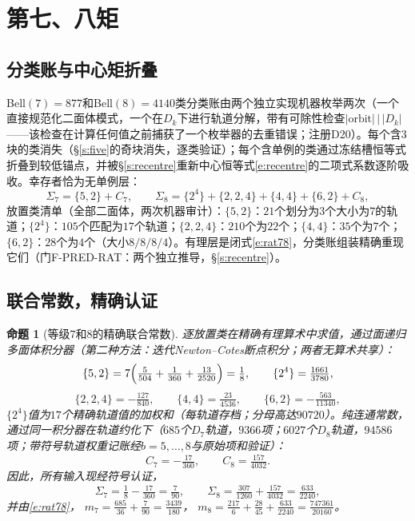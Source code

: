 \documentclass[11pt]{article}
\numberwithin{equation}{section}
\newtheorem{proposition}[theorem]{命题}
\theoremstyle{definition}
\theoremstyle{remark}
\begin{document}
\section{第七、八矩}\label{s:seven}

\subsection{分类账与中心矩折叠}\label{s:seven:ledger}

Bell$(7)=877$和Bell$(8)=4140$类分类账由两个独立实现机器枚举两次（一个直接规范化二面体模式，一个在$D_k$下进行轨道分解，带有可除性检查$|\mathrm{orbit}|\,\big|\,|D_k|$——该检查在计算任何值之前捕获了一个枚举器的去重错误；注册D20）。每个含$3$块的类消失（\S\ref{s:five}的奇块消失，逐类验证）；每个含单例的类通过冻结槽恒等式折叠到较低锚点，并被\S\ref{s:recentre}重新中心恒等式\eqref{e:recentre}的二项式系数逐阶吸收。幸存者恰为无单例层：
\[
\Sigma_7=\{5,2\}+C_7,
\qquad
\Sigma_8=\{2^4\}+\{2,2,4\}+\{4,4\}+\{6,2\}+C_8,
\]
放置类清单（全部二面体，两次机器审计）：$\{5,2\}$：$21$个划分为$3$个大小为$7$的轨道；$\{2^4\}$：$105$个匹配为$17$个轨道；$\{2,2,4\}$：$210$个为$22$个；$\{4,4\}$：$35$个为$7$个；$\{6,2\}$：$28$个为$4$个（大小$8/8/8/4$）。有理层是闭式\eqref{e:rat78}，分类账组装精确重现它们（门F-PRED-RAT：两个独立推导，\S\ref{s:recentre}）。

\subsection{联合常数，精确认证}\label{s:seven:conn}

\begin{proposition}[等级$7$和$8$的精确联合常数]\label{p:joints78}
逐放置类在精确有理算术中求值，通过面递归多面体积分器（第二种方法：迭代Newton--Cotes断点积分；两者无算术共享）：
\[
\{5,2\}=7\Bigl(\tfrac5{504}+\tfrac1{360}+\tfrac{13}{2520}\Bigr)
=\tfrac18,
\qquad
\{2^4\}=\tfrac{1661}{3780},
\]
\[
\{2,2,4\}=-\tfrac{127}{840},\qquad
\{4,4\}=\tfrac{23}{4536},\qquad
\{6,2\}=-\tfrac{563}{11340},
\]
$\{2^4\}$值为$17$个精确轨道值的加权和（每轨道存档；分母高达$90720$）。纯连通常数，通过同一积分器在轨道约化下（$685$个$D_7$轨道，$9366$项；$6027$个$D_8$轨道，$94586$项；带符号轨道权重记账经$b=5,\dots,8$与原始项和验证）：
\[
C_7=-\tfrac{17}{360},
\qquad
C_8=\tfrac{157}{4032}.
\]
因此，所有输入现经符号认证，
\[
\Sigma_7=\tfrac18-\tfrac{17}{360}=\tfrac7{90},
\qquad
\Sigma_8=\tfrac{307}{1260}+\tfrac{157}{4032}=\tfrac{633}{2240},
\]
并由\eqref{e:rat78}，
$m_7=\tfrac{685}{36}+\tfrac7{90}=\tfrac{3439}{180}$，
$m_8=\tfrac{217}6+\tfrac{28}{45}+\tfrac{633}{2240}
=\tfrac{747361}{20160}$。
\end{proposition}
\end{document}

